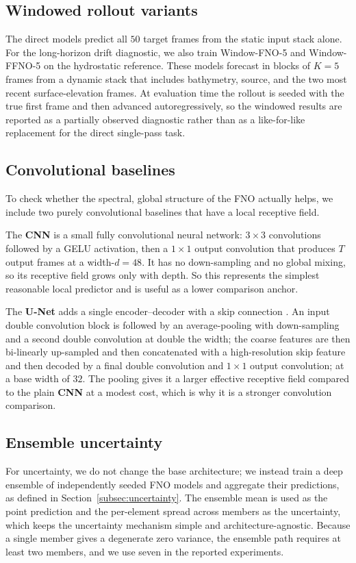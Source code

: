 \subsection{Windowed rollout variants}
\label{subsec:window-models}

The direct models predict all $50$ target frames from the static input stack alone. For the long-horizon drift diagnostic, we also train Window-FNO-5 and Window-FFNO-5 on the hydrostatic reference. These models forecast in blocks of $K=5$ frames from a dynamic stack that includes bathymetry, source, and the two most recent surface-elevation frames. At evaluation time the rollout is seeded with the true first frame and then advanced autoregressively, so the windowed results are reported as a partially observed diagnostic rather than as a like-for-like replacement for the direct single-pass task.

\subsection{Convolutional baselines}
\label{subsec:conv-baseline}

To check whether the spectral, global structure of the FNO actually helps, we include two purely convolutional baselines that have a local receptive field.

The \textbf{CNN} is a small fully convolutional neural network: $3 \times 3$ convolutions followed by a GELU activation, then a $1 \times 1$ output convolution that produces $T$ output frames at a width-$d = 48$. It has no down-sampling and no global mixing, so its receptive field grows only with depth. So this represents the simplest reasonable local predictor and is useful as a lower comparison anchor.

The \textbf{U-Net} adds a single encoder--decoder with a skip connection \citep{ronneberger2015unet}. An input double convolution block is followed by an average-pooling with down-sampling and a second double convolution at double the width; the coarse features are then bi-linearly up-sampled and then concatenated with a high-resolution skip feature and then decoded by a final double convolution and $1 \times 1$ output convolution; at a base width of $32$. The pooling gives it a larger effective receptive field compared to the plain \textbf{CNN} at a modest cost, which is why it is a stronger convolution comparison.

\subsection{Ensemble uncertainty}
\label{subsec:model-ensemble}
For uncertainty, we do not change the base architecture; we instead train a deep ensemble of independently seeded FNO models and aggregate their predictions, as defined in Section~\ref{subsec:uncertainty}. The ensemble mean is used as the point prediction and the per-element spread across members as the uncertainty, which keeps the uncertainty mechanism simple and architecture-agnostic. Because a single member gives a degenerate zero variance, the ensemble path requires at least two members, and we use seven in the reported experiments.
